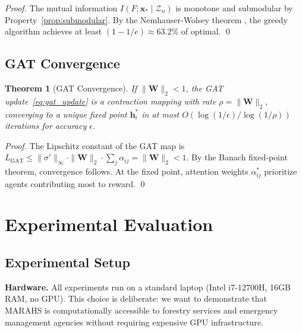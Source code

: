 \documentclass[12pt,a4paper]{article}
\DeclareRobustCommand{\cZ}{\mathcal{Z}}
\DeclareRobustCommand{\vect}[1]{\bm{#1}}
\DeclareRobustCommand{\mat}[1]{\bm{#1}}
\newtheorem{theorem}{Theorem}[section]
\begin{document}
\begin{proof}
The mutual information $I(F; \vect{x}_* \mid \cZ_n)$ is monotone and submodular by Property~\ref{prop:submodular}. By the Nemhauser-Wolsey theorem \cite{Nemhauser1978}, the greedy algorithm achieves at least $(1-1/e) \approx 63.2\%$ of optimal. \qed
\end{proof}

\subsection{GAT Convergence}

\begin{theorem}[GAT Convergence]
\label{thm:gat_conv}
If $\|\mat{W}\|_2 < 1$, the GAT update~\eqref{eq:gat_update} is a contraction mapping with rate $\rho = \|\mat{W}\|_2$, converging to a unique fixed point $\vect{h}_i^*$ in at most $O(\log(1/\epsilon) / \log(1/\rho))$ iterations for accuracy $\epsilon$.
\end{theorem}

\begin{proof}
The Lipschitz constant of the GAT map is $L_{\text{GAT}} \leq \|\sigma'\|_\infty \cdot \|\mat{W}\|_2 \cdot \sum_j \alpha_{ij} = \|\mat{W}\|_2 < 1$. By the Banach fixed-point theorem, convergence follows. At the fixed point, attention weights $\alpha_{ij}^*$ prioritize agents contributing most to reward. \qed
\end{proof}


\section{Experimental Evaluation}
\label{sec:experiments}

\subsection{Experimental Setup}

\textbf{Hardware.} All experiments run on a standard laptop (Intel i7-12700H, 16GB RAM, no GPU). This choice is deliberate: we want to demonstrate that MARAHS is computationally accessible to forestry services and emergency management agencies without requiring expensive GPU infrastructure.
\end{document}
